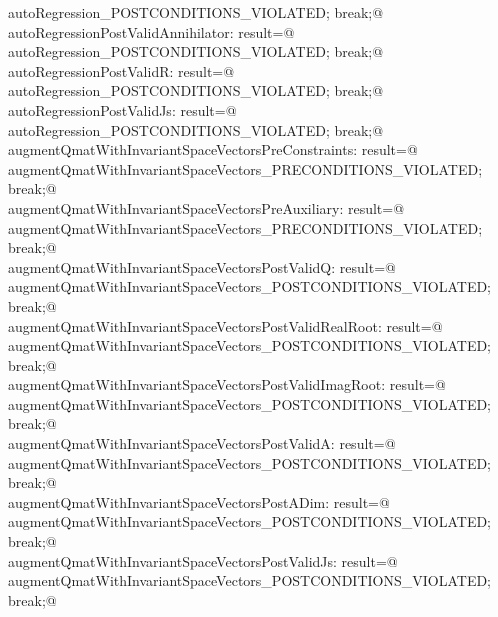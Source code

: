 \documentclass{article}
\begin{document}
\begin{flushleft}
\begin{minipage}{\linewidth}
\begin{list}{}{}
\mbox{}\verb@  autoRegression_POSTCONDITIONS_VIOLATED; break;@\\
\mbox{}\verb@case  autoRegressionPostValidAnnihilator: result=@\\
\mbox{}\verb@  autoRegression_POSTCONDITIONS_VIOLATED; break;@\\
\mbox{}\verb@case  autoRegressionPostValidR: result=@\\
\mbox{}\verb@  autoRegression_POSTCONDITIONS_VIOLATED; break;@\\
\mbox{}\verb@case  autoRegressionPostValidJs: result=@\\
\mbox{}\verb@  autoRegression_POSTCONDITIONS_VIOLATED; break;@\\
\mbox{}\verb@case  augmentQmatWithInvariantSpaceVectorsPreConstraints: result=@\\
\mbox{}\verb@  augmentQmatWithInvariantSpaceVectors_PRECONDITIONS_VIOLATED; break;@\\
\mbox{}\verb@case  augmentQmatWithInvariantSpaceVectorsPreAuxiliary: result=@\\
\mbox{}\verb@  augmentQmatWithInvariantSpaceVectors_PRECONDITIONS_VIOLATED; break;@\\
\mbox{}\verb@case  augmentQmatWithInvariantSpaceVectorsPostValidQ: result=@\\
\mbox{}\verb@  augmentQmatWithInvariantSpaceVectors_POSTCONDITIONS_VIOLATED; break;@\\
\mbox{}\verb@case  augmentQmatWithInvariantSpaceVectorsPostValidRealRoot: result=@\\
\mbox{}\verb@  augmentQmatWithInvariantSpaceVectors_POSTCONDITIONS_VIOLATED; break;@\\
\mbox{}\verb@case  augmentQmatWithInvariantSpaceVectorsPostValidImagRoot: result=@\\
\mbox{}\verb@  augmentQmatWithInvariantSpaceVectors_POSTCONDITIONS_VIOLATED; break;@\\
\mbox{}\verb@case  augmentQmatWithInvariantSpaceVectorsPostValidA: result=@\\
\mbox{}\verb@  augmentQmatWithInvariantSpaceVectors_POSTCONDITIONS_VIOLATED; break;@\\
\mbox{}\verb@case  augmentQmatWithInvariantSpaceVectorsPostADim: result=@\\
\mbox{}\verb@  augmentQmatWithInvariantSpaceVectors_POSTCONDITIONS_VIOLATED; break;@\\
\mbox{}\verb@case  augmentQmatWithInvariantSpaceVectorsPostValidJs: result=@\\
\mbox{}\verb@  augmentQmatWithInvariantSpaceVectors_POSTCONDITIONS_VIOLATED; break;@\\

\end{list}
\end{minipage}
\end{flushleft}
\end{document}
